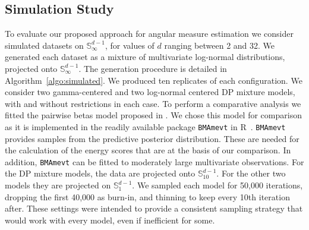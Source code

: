 \subsection{Simulation Study\label{subsec:simulated}}
To evaluate our proposed approach for angular measure estimation 
    we consider simulated datasets on $\mathbb{S}_{\infty}^{d-1}$,
    for values of $d$ ranging between 2 and 32.  We generated each
    dataset as a mixture of multivariate log-normal distributions,
    projected onto $\mathbb{S}_{\infty}^{d-1}$. The generation 
    procedure is detailed in Algorithm~\ref{algo:simulated}. We produced 
    ten replicates of each configuration. We consider two gamma-centered
    and two log-normal centered DP mixture models, with and without restrictions in each
    case. To perform a comparative analysis we fitted 
    the pairwise betas model proposed in \cite{COOLEY2010}. We chose this model for comparison
    as it is implemented in the readily available package \verb|BMAmevt| 
    in R~\citep{BMAmevt}. \verb|BMAmevt| provides samples from the predictive
    posterior distribution. These are needed for the calculation of the energy
    scores that are at the basis of our comparison. In addition, \verb|BMAmevt| can 
    be fitted to moderately large multivariate observations. For the DP mixture
    models, the data are projected onto $\mathbb{S}_{10}^{d-1}$. For the other
    two models they are projected on $\mathbb{S}_1^{d-1}$.   We sampled each model for 50,000 
    iterations, dropping the first 40,000 as burn-in, and thinning to keep every 10th iteration
    after.  These settings were intended to provide a consistent sampling strategy that would
    work with every model, even if inefficient for some.


